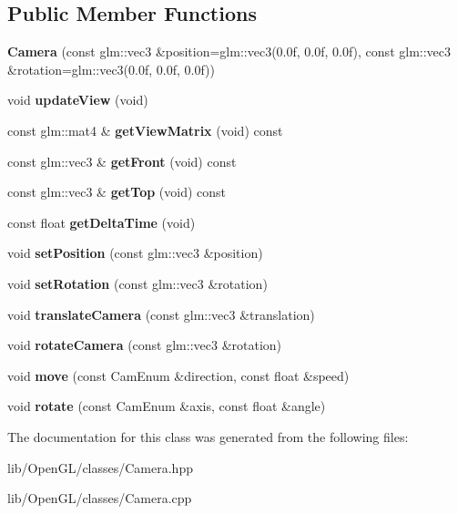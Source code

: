 \subsection*{Public Member Functions}
\begin{DoxyCompactItemize}
\item 
\mbox{\label{class_camera_a93e120c95f48fcc3a317b4dd318368b5}} 
{\bfseries Camera} (const glm\+::vec3 \&position=glm\+::vec3(0.\+0f, 0.\+0f, 0.\+0f), const glm\+::vec3 \&rotation=glm\+::vec3(0.\+0f, 0.\+0f, 0.\+0f))
\item 
\mbox{\label{class_camera_abf048471bef22e204b5d897c46503abf}} 
void {\bfseries update\+View} (void)
\item 
\mbox{\label{class_camera_a9a041ae11fa64b5edd843e0a98f8bebc}} 
const glm\+::mat4 \& {\bfseries get\+View\+Matrix} (void) const
\item 
\mbox{\label{class_camera_a07cf0b0b59c54d768e288f9b8290db51}} 
const glm\+::vec3 \& {\bfseries get\+Front} (void) const
\item 
\mbox{\label{class_camera_ace0d7f4531021d311c9adba9d085915c}} 
const glm\+::vec3 \& {\bfseries get\+Top} (void) const
\item 
\mbox{\label{class_camera_a9f3ce98d151484af91ae5281e517753e}} 
const float {\bfseries get\+Delta\+Time} (void)
\item 
\mbox{\label{class_camera_a6c80882e87be75bde67f432ca3b21607}} 
void {\bfseries set\+Position} (const glm\+::vec3 \&position)
\item 
\mbox{\label{class_camera_afb765b3e938107102cc855ff5dde2248}} 
void {\bfseries set\+Rotation} (const glm\+::vec3 \&rotation)
\item 
\mbox{\label{class_camera_a4e1d6d8c4640a37cbdc93cf03c8ead42}} 
void {\bfseries translate\+Camera} (const glm\+::vec3 \&translation)
\item 
\mbox{\label{class_camera_ac37e0a9bc966151c94607a4ef57f750a}} 
void {\bfseries rotate\+Camera} (const glm\+::vec3 \&rotation)
\item 
\mbox{\label{class_camera_a5a3b649297187b0cb38256dd193df84e}} 
void {\bfseries move} (const Cam\+Enum \&direction, const float \&speed)
\item 
\mbox{\label{class_camera_a1fcaf262ca8a781b8a43ae8243ef7a12}} 
void {\bfseries rotate} (const Cam\+Enum \&axis, const float \&angle)
\end{DoxyCompactItemize}


The documentation for this class was generated from the following files\+:\begin{DoxyCompactItemize}
\item 
lib/\+Open\+G\+L/classes/Camera.\+hpp\item 
lib/\+Open\+G\+L/classes/Camera.\+cpp\end{DoxyCompactItemize}
